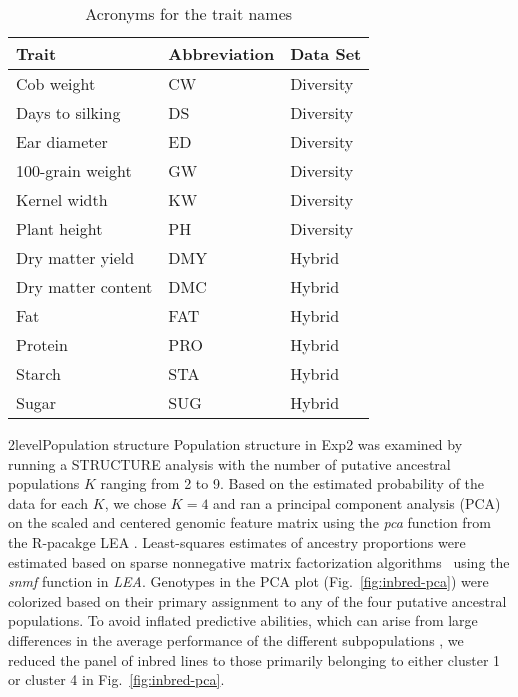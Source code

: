 \documentclass[12pt,titlepage]{article}
\begin{document}
\begin{table}[]
\centering
\caption{Acronyms for the trait names}
\label{table:TraitKey}
\begin{tabular}{@{}lll@{}}
\toprule
Trait              & Abbreviation & Data Set  \\ \midrule
Cob weight         & CW           & Diversity \\
Days to silking    & DS           & Diversity \\
Ear diameter       & ED           & Diversity \\
100-grain weight   & GW           & Diversity \\
Kernel width       & KW           & Diversity \\
Plant height       & PH           & Diversity \\
Dry matter yield   & DMY          & Hybrid    \\
Dry matter content & DMC          & Hybrid    \\
Fat                & FAT          & Hybrid    \\
Protein            & PRO          & Hybrid    \\
Starch             & STA          & Hybrid    \\
Sugar              & SUG          & Hybrid    \\ \bottomrule
\end{tabular}
\end{table}


\Genetics2level{Population structure}
Population structure in Exp2 was examined by running a STRUCTURE
\cite{Pritchard2000} analysis with the number of putative ancestral
populations $K$ ranging from 2 to 9.
Based on the estimated probability of the data for each $K$, we chose $K=4$
and ran a principal component analysis (PCA) on the scaled and centered
genomic feature matrix using the \emph{pca} function from the R-pacakge LEA
\cite{Frichot2015}.
Least-squares estimates of ancestry proportions were estimated based on sparse 
nonnegative matrix factorization algorithms~\cite{Frichot2014} using the 
\emph{snmf} function in \textit{LEA}.
Genotypes in the PCA plot (Fig.~\ref{fig:inbred-pca}) were colorized based on their
primary assignment to any of the four putative ancestral populations.
To avoid inflated predictive abilities, which can arise from large differences
in the average performance of the different subpopulations
\cite{Windhausen2012}, we reduced the panel of inbred lines to those primarily
belonging to either cluster 1 or cluster 4 in Fig.~\ref{fig:inbred-pca}.
\end{document}
